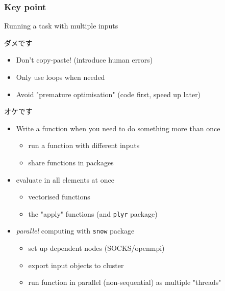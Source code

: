 \documentclass{beamer}
\begin{document}
      \begin{frame}
    \frametitle{Key point}
      
Running a task with multiple inputs

\begin{CJK}{UTF8}{min}ダメです\end{CJK}
     
     \begin{itemize}
    \item  Don't copy-paste!  (introduce human errors)
    
    \item Only use loops when needed
    
    \item Avoid "premature optimisation" (code first, speed up later)
    
    \end{itemize}
    
    \begin{CJK}{UTF8}{min}オケです\end{CJK}
    \begin{itemize}
    
    \item Write a function when you need to do something more than once 
     \begin{itemize}
       \item run a function with different inputs
       \item share functions in packages
       \end{itemize}
       
       \item evaluate in all elements at once
     \begin{itemize}
       \item vectorised functions
       \item the "apply" functions (and \texttt{plyr} package) 
       \end{itemize}
       
       \item \textit{parallel} computing with \texttt{snow} package
     \begin{itemize}
       \item set up dependent nodes (SOCKS/openmpi)
       \item  export input objects to cluster
       \item run function in parallel (non-sequential) as multiple "threads"
       \end{itemize}
     
     \end{itemize}
      \end{frame}
      
\end{document}
